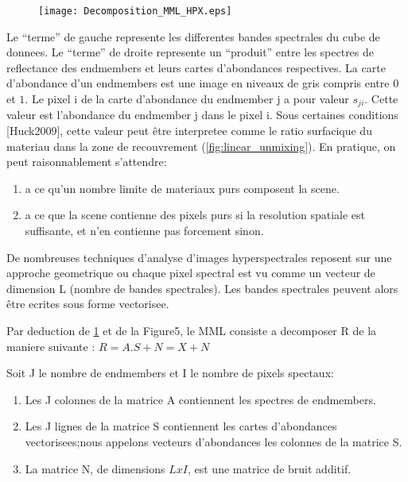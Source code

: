 \begin{figure}[h]
  \centering
  \texttt{[image: Decomposition\_MML\_HPX.eps]}
  \label{fig:decomp_mml}
\end{figure}

Le ``terme'' de gauche represente les differentes bandes spectrales du
cube de donnees. Le ``terme'' de droite represente un ``produit''
entre les spectres de reflectance des endmembers et leurs cartes
d'abondances respectives. La carte d'abondance d'un endmembers est une
image en niveaux de gris compris entre $0$ et $1$. Le pixel i de la carte
d'abondance du endmember j a pour valeur $s_{ji}$. Cette valeur est
l'abondance du endmember j dans le pixel i. Sous certaines conditions
[Huck2009], cette valeur peut être interpretee comme le ratio
surfacique du materiau dans la zone de recouvrement (\ref{fig:linear_unmixing}).  En
pratique, on peut raisonnablement s'attendre: 

\begin{enumerate}
\item{a ce qu'un nombre
limite de materiaux purs composent la scene.}
\item{a ce que la scene
contienne des pixels purs si la resolution spatiale est suffisante, et
n'en contienne pas forcement sinon.}
\end{enumerate}
 
De nombreuses techniques d'analyse d'images hyperspectrales reposent
sur une approche geometrique ou chaque pixel spectral est vu comme un
vecteur de dimension L (nombre de bandes spectrales). Les
bandes spectrales peuvent alors être ecrites sous forme vectorisee.


Par deduction de \ref{fig:decomp_mml} et de la Figure5, le MML consiste a decomposer R
de la maniere suivante : $R= A.S + N = X + N$

Soit J le nombre de endmembers et I le nombre de pixels spectaux: 
\begin{enumerate}
\item{Les J colonnes de la matrice A contiennent les spectres de endmembers.}
\item{Les J lignes de la matrice S contiennent les cartes d'abondances
vectorisees;nous appelons vecteurs d'abondances les colonnes de la
matrice S.}
\item{La matrice N, de dimensions $LxI$, est une matrice de bruit
additif.}
\end{enumerate}

